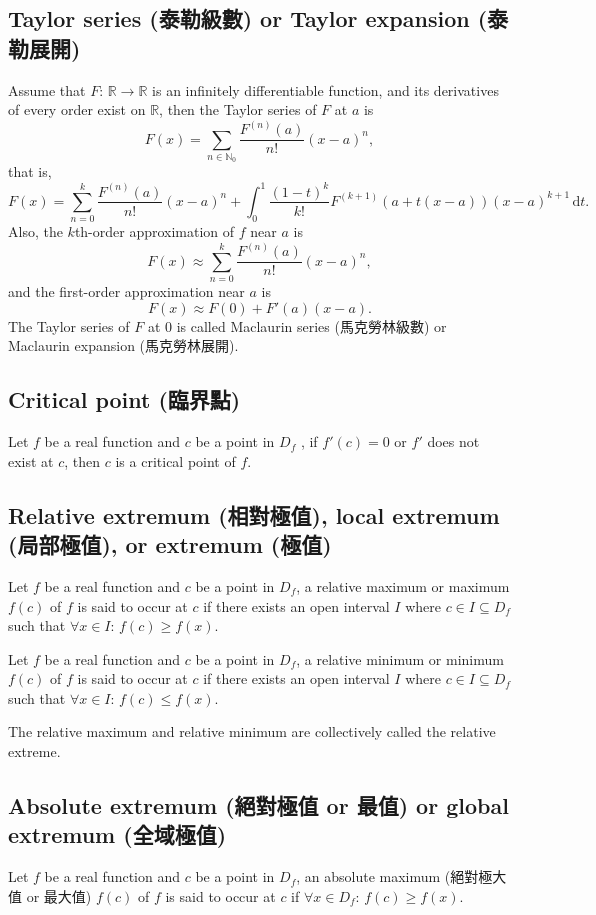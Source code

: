 \documentclass[a4paper,12pt]{report}
\begin{document}
\subsection{Taylor series (泰勒級數) or Taylor expansion (泰勒展開)}
Assume that $F:\,\mathbb{R}\to\mathbb{R}$ is an infinitely differentiable function, and its derivatives of every order exist on $\mathbb{R}$, then the Taylor series of $F$ at $a$ is
\[F(x) = \sum_{n\in\mathbb{N}_0} \frac{F^{(n)}(a)}{n!}(x-a)^n,\]
that is,
\[F(x) = \sum^k_{n=0} \frac{F^{(n)}(a)}{n!}(x-a)^n+\int_0^1\frac{(1-t)^k}{k!}F^{(k+1)}(a+t(x-a))(x-a)^{k+1}\,\mathrm{d}t.\]
Also, the $k$th-order approximation of $f$ near $a$ is
\[F(x) \approx \sum^k_{n=0} \frac{F^{(n)}(a)}{n!}(x-a)^n,\]
and the first-order approximation near $a$ is
\[F(x) \approx F(0)+F'(a)(x-a).\]
The Taylor series of $F$ at $0$ is called Maclaurin series (馬克勞林級數) or Maclaurin expansion (馬克勞林展開).
\subsection{Critical point (臨界點)}
Let $f$ be a real function and \( c \) be a point in \( D_f \) , if \( f'(c) = 0 \) or \( f' \) does not exist at \( c \), then \( c \) is a critical point of \( f \).
\subsection{Relative extremum (相對極值), local extremum (局部極值), or extremum (極值)}
Let $f$ be a real function and \( c \) be a point in \( D_f \), a relative maximum or maximum \( f(c) \) of \(f\) is said to occur at $c$ if there exists an open interval $I$ where \( c\in I \subseteq D_f \) such that \( \forall x\in I:\, f(c) \geq f(x) \).

Let $f$ be a real function and \( c \) be a point in \( D_f \), a relative minimum or minimum \( f(c) \) of \(f\) is said to occur at $c$ if there exists an open interval $I$ where \( c\in I \subseteq D_f \) such that \( \forall x\in I:\, f(c) \leq f(x) \).

The relative maximum and relative minimum are collectively called the relative extreme.
\subsection{Absolute extremum (絕對極值 or 最值) or global extremum (全域極值)}
Let $f$ be a real function and \( c \) be a point in \( D_f \), an absolute maximum (絕對極大值 or 最大值) \( f(c) \) of \(f\) is said to occur at $c$ if \( \forall x\in D_f:\, f(c) \geq f(x) \).
\end{document}
